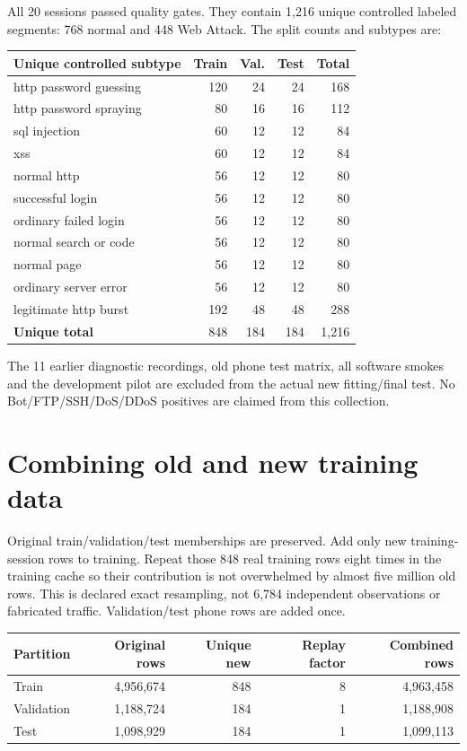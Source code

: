 \documentclass[11pt,a4paper,oneside]{report}
\begin{document}
All 20 sessions passed quality gates. They contain 1,216 unique controlled labeled segments: 768 normal and 448 Web Attack. The split counts and subtypes are:

{\small
\begin{longtable}{@{}lrrrr@{}}
\toprule
Unique controlled subtype & Train & Val. & Test & Total\\\midrule\endhead
http password guessing & 120 & 24 & 24 & 168\\
http password spraying & 80 & 16 & 16 & 112\\
sql injection & 60 & 12 & 12 & 84\\
xss & 60 & 12 & 12 & 84\\
normal http & 56 & 12 & 12 & 80\\
successful login & 56 & 12 & 12 & 80\\
ordinary failed login & 56 & 12 & 12 & 80\\
normal search or code & 56 & 12 & 12 & 80\\
normal page & 56 & 12 & 12 & 80\\
ordinary server error & 56 & 12 & 12 & 80\\
legitimate http burst & 192 & 48 & 48 & 288\\
\textbf{Unique total} & 848 & 184 & 184 & 1,216\\
\bottomrule\end{longtable}
}

The 11 earlier diagnostic recordings, old phone test matrix, all software smokes and the development pilot are excluded from the actual new fitting/final test. No Bot/FTP/SSH/DoS/DDoS positives are claimed from this collection.

\section{Combining old and new training data}
Original train/validation/test memberships are preserved. Add only new training-session rows to training. Repeat those 848 real training rows eight times in the training cache so their contribution is not overwhelmed by almost five million old rows. This is declared exact resampling, not 6,784 independent observations or fabricated traffic. Validation/test phone rows are added once.


{\small
\begin{longtable}{@{}lrrrr@{}}
\toprule
Partition & Original rows & Unique new & Replay factor & Combined rows\\\midrule\endhead
Train & 4,956,674 & 848 & 8 & 4,963,458\\
Validation & 1,188,724 & 184 & 1 & 1,188,908\\
Test & 1,098,929 & 184 & 1 & 1,099,113\\
\bottomrule\end{longtable}
}
\end{document}
